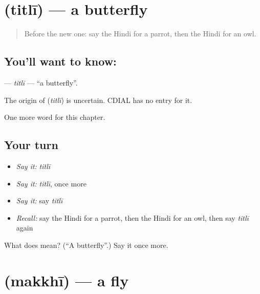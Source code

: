 \section[\texorpdfstring{\hi{तितली} (titlī)}{तितली (titlī)}]{ (titlī) — a butterfly}

\label{lesson:HI-C148-titli}



\begin{quote}
Before the new one: say the Hindi for a parrot, then the Hindi for an owl.
\end{quote}

\subsection*{You'll want to know: }
\textbf{} — \emph{titlī} — \textquotedblleft{}a butterfly\textquotedblright{}.

\begin{cousinweb}
The origin of \textbf{} (\emph{titlī}) is uncertain. CDIAL has no entry for it.
\end{cousinweb}

\begin{grammarlens}[title={What you've built}]
One more word for this chapter.
\end{grammarlens}

\subsection*{Your turn}
\begin{itemize}
\raggedright
  \item \emph{Say it:} \emph{titlī}
  \item \emph{Say it:} \emph{titlī}, once more
  \item \emph{Say it:} say \emph{titlī}
  \item \emph{Recall:} say the Hindi for a parrot, then the Hindi for an owl, then say \emph{titlī} again
\end{itemize}

\begin{tcolorbox}[breakable,colback=teal!4,colframe=teal!35!black,title={Before you move on}]
What does  mean? (\textquotedblleft{}A butterfly\textquotedblright{}.) Say it once more.
\end{tcolorbox}
\section[\texorpdfstring{\hi{मक्खी} (makkhī)}{मक्खी (makkhī)}]{ (makkhī) — a fly}

